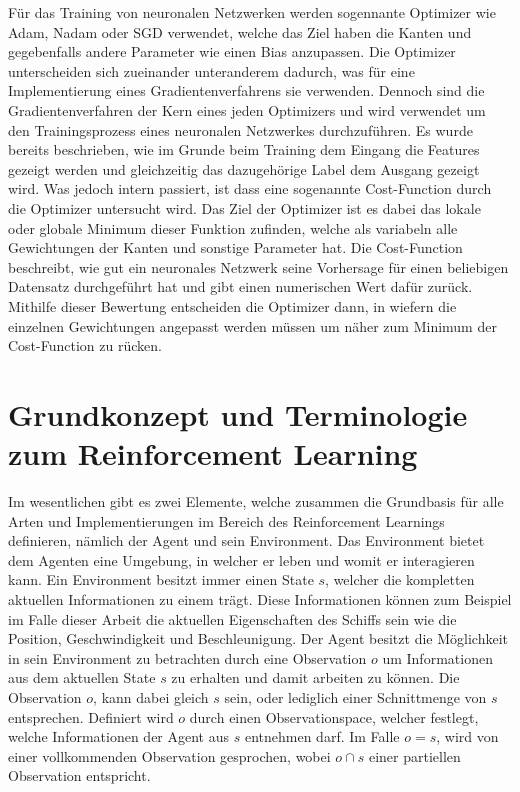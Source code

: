 \documentclass[]{iat}
\begin{document}
Für das Training von neuronalen Netzwerken werden sogennante Optimizer wie Adam, Nadam oder SGD verwendet, welche das Ziel haben die Kanten und gegebenfalls andere Parameter wie einen Bias anzupassen. Die Optimizer unterscheiden sich zueinander unteranderem dadurch, was für eine Implementierung eines Gradientenverfahrens sie verwenden. Dennoch sind die Gradientenverfahren der Kern eines jeden Optimizers und wird verwendet um den Trainingsprozess eines neuronalen Netzwerkes durchzuführen. Es wurde bereits beschrieben, wie im Grunde beim Training dem Eingang die Features gezeigt werden und gleichzeitig das dazugehörige Label dem Ausgang gezeigt wird. Was jedoch intern passiert, ist dass eine sogenannte Cost-Function durch die Optimizer untersucht wird. Das Ziel der Optimizer ist es dabei das lokale oder globale Minimum dieser Funktion zufinden, welche als variabeln alle Gewichtungen der Kanten und sonstige Parameter hat. Die Cost-Function beschreibt, wie gut ein neuronales Netzwerk seine Vorhersage für einen beliebigen Datensatz durchgeführt hat und gibt einen numerischen Wert dafür zurück. Mithilfe dieser Bewertung entscheiden die Optimizer dann, in wiefern die einzelnen Gewichtungen angepasst werden müssen um näher zum Minimum der Cost-Function zu rücken.

\newpage
\section{Grundkonzept und Terminologie zum Reinforcement Learning} \label{sec:grundkonzept_rf}
Im wesentlichen gibt es zwei Elemente, welche zusammen die Grundbasis für alle Arten und Implementierungen im Bereich des Reinforcement Learnings definieren, nämlich der Agent und sein Environment. Das Environment bietet dem Agenten eine Umgebung, in welcher er leben und womit er interagieren kann. Ein Environment besitzt immer einen State $s$, welcher die kompletten aktuellen Informationen zu einem trägt. Diese Informationen können zum Beispiel im Falle dieser Arbeit die aktuellen Eigenschaften des Schiffs sein wie die Position, Geschwindigkeit und Beschleunigung. Der Agent besitzt die Möglichkeit in sein Environment zu betrachten durch eine Observation $o$ um Informationen aus dem aktuellen State $s$ zu erhalten und damit arbeiten zu können. Die Observation $o$, kann dabei gleich $s$ sein, oder lediglich einer Schnittmenge von $s$ entsprechen. Definiert wird $o$ durch einen Observationspace, welcher festlegt, welche Informationen der Agent aus $s$ entnehmen darf. Im Falle $o=s$, wird von einer vollkommenden Observation gesprochen, wobei $o \cap s$ einer partiellen Observation entspricht.
\end{document}
